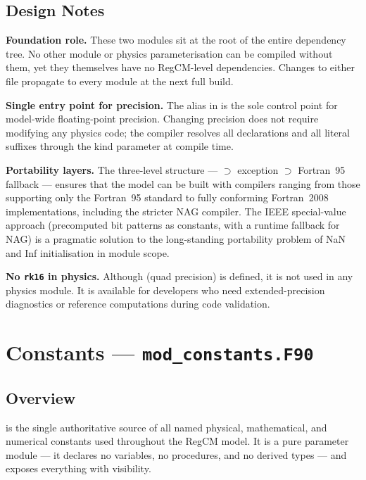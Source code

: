\subsection{Design Notes}

\textbf{Foundation role.} These two modules sit at the root of the entire
dependency tree. No other  module or physics parameterisation
can be compiled without them, yet they themselves have no RegCM-level
dependencies. Changes to either file propagate to every module at the next
full build.

\textbf{Single entry point for precision.} The  alias in
 is the sole control point for model-wide floating-point
precision. Changing precision does not require modifying any physics code;
the compiler resolves all  declarations and all 
literal suffixes through the kind parameter at compile time.

\textbf{Portability layers.} The three-level structure ---
 $\supset$  exception $\supset$ Fortran~95 fallback
--- ensures that the model can be built with compilers ranging from those
supporting only the Fortran~95 standard to fully conforming Fortran~2008
implementations, including the stricter NAG compiler. The IEEE special-value
approach (precomputed bit patterns as  constants, with a
runtime fallback for NAG) is a pragmatic solution to the long-standing
portability problem of NaN and Inf initialisation in module scope.

\textbf{No \texttt{rk16} in physics.} Although  (quad precision)
is defined, it is not used in any physics module. It is available for
developers who need extended-precision diagnostics or reference computations
during code validation.

\section{Constants --- \texttt{mod\_constants.F90}}
\label{sec:constants}

\subsection{Overview}

 is the single authoritative source of all named
physical, mathematical, and numerical constants used throughout the RegCM
model. It is a pure parameter module --- it declares no variables, no
procedures, and no derived types --- and exposes everything with
 visibility.

